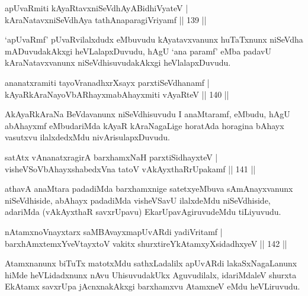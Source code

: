 \begin{shl}
apUvaRmiti kAyaRtavxniSeVdhAyABidhiVyateV |\\
kAraNatavxniSeVdhAya tathA\s naparagiVriyamf \hfill || 139 ||
\end{shl}

\begin{artha}
`apUvaRmf' pUvaRvilalxdudx eMbuvudu kAyatavxvanunx huTaTxnunx niSeVdha   mADuvudakAkxgi heVLalapxDuvudu, hAgU `ana paramf' eMba padavU   kAraNatavxvanunx niSeVdhisuvudakAkxgi heVlalapxDuvudu.
\end{artha}


\begin{shl}
ananatxramiti tayoVranadhxrXsayx parxtiSeVdhanamf |\\
kAyaRkAraNayoVbARhayxmabAhayxmiti vAyaRteV \hfill || 140 ||
\end{shl}

\begin{artha}
AkAyaRkAraNa BeVdavanunx niSeVdhisuvudu I anaMtaramf, eMbudu, hAgU abAhayxmf eMbudariMda kAyaR kAraNagaLige horatAda horagina bAhayx vasutxvu ilalxdedxMdu nivArisulapxDuvudu.
\end{artha}


\begin{shl}
satAtx vA\s nanatxragirA barxhamxNaH parxtiSidhayxteV |\\
visheVSoV\s bAhayxshabedxVna tatoV vAkAyxthaRrUpakamf \hfill || 141 ||
\end{shl}

\begin{artha}
athavA anaMtara padadiMda barxhamxnige satetxyeMbuva sAmAnayxvanunx niSeVdhiside, abAhayx padadiMda visheVSavU ilalxdeMdu niSeVdhiside, adariMda (vAkAyxthaR savxrUpavu) EkarUpavAgiruvudeMdu tiLiyuvudu.
\end{artha}


		\begin{shl}
nA\s \s tamxnoV\s nayxtarx saMBAvayxmapUvARdi yadiVritamf |\\
barxhAmx\s \s temxYveVtayxtoV vakitx shurxtireYkAtamxyXsidadhxyeV \hfill || 142 ||
\end{shl}

\begin{artha}
Atamxnanunx biTuTx matotxMdu sathxLadalilx apUvARdi lakaSxNagaLanunx hiMde heVLidadxnunx nAvu UhisuvudakUkx Aguvudilalx, idariMdaleV shurxta EkAtamx savxrUpa jAcnxnakAkxgi barxhamxvu AtamxneV eMdu heVLiruvudu.
\end{artha}

